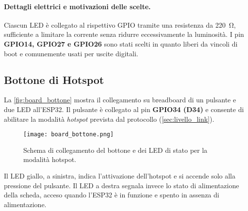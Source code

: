 \begin{table}[H]
  \centering
  \label{tab:led_pins}
  \caption{Mappatura hardware dei pin di uscita dell’ESP32 verso i LED di stato.}
\end{table}

\paragraph{Dettagli elettrici e motivazioni delle scelte.}
Ciascun LED è collegato al rispettivo GPIO tramite una resistenza da \SI{220}{\ohm}, sufficiente a limitare la corrente senza ridurre eccessivamente la luminosità.  
I pin \textbf{GPIO14, GPIO27 e GPIO26} sono stati scelti in quanto liberi da vincoli di boot e comunemente usati per uscite digitali.  

\subsection{Bottone di Hotspot}
\label{subsec:button_hotspot}

La \autoref{fig:board_bottone} mostra il collegamento su breadboard di un pulsante e due LED all’ESP32.  
Il pulsante è collegato al pin \textbf{GPIO34 (D34)} e consente di abilitare la modalità \textit{hotspot} prevista dal protocollo (\autoref{sec:livello_link}).  

\begin{figure}[H]
  \centering
  \texttt{[image: board\_bottone.png]}
  \caption{Schema di collegamento del bottone e dei LED di stato per la modalità hotspot.}
  \label{fig:board_bottone}
\end{figure}

Il LED giallo, a sinistra, indica l’attivazione dell’hotspot e si accende solo alla pressione del pulsante.  
Il LED a destra segnala invece lo stato di alimentazione della scheda, acceso quando l’ESP32 è in funzione e spento in assenza di alimentazione.  
 
